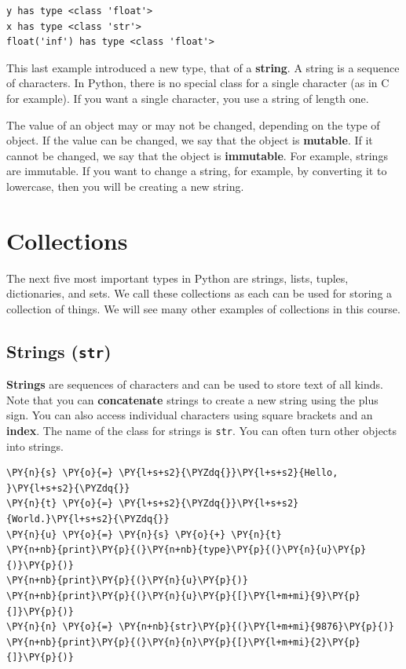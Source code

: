 \begin{Verbatim}
y has type <class 'float'>
x has type <class 'str'>
float('inf') has type <class 'float'>
\end{Verbatim}


This last example introduced a new type, that of a \textbf{string}.  A string is a sequence of characters.  In Python, there is no special class for a single character (as in C for example).
If you want a single character, you use a string of length one.


The value of an object may or may not be changed, depending on the type of object.
If the value can be changed, we say that the object is \textbf{mutable}.
If it cannot be changed, we say that the object is \textbf{immutable}.
For example, strings are immutable.  If you want to change a string, for example, by converting it to lowercase, then you will be creating a new string.

\section{Collections}


The next five most important types in Python are strings, lists, tuples, dictionaries, and sets.  We call these collections as each can be used for storing a collection of things.  We will see many other examples of collections in this course.

\subsection{Strings  (\texttt{str})}


\textbf{Strings} are sequences of characters and can be used to store text of all kinds.  Note that you can \textbf{concatenate} strings to create a new string using the plus sign.  You can also access individual characters using square brackets and an \textbf{index}.  The name of the class for strings is \texttt{str}.  You can often turn other objects into strings.


\begin{Verbatim}[commandchars=\\\{\}]
\PY{n}{s} \PY{o}{=} \PY{l+s+s2}{\PYZdq{}}\PY{l+s+s2}{Hello, }\PY{l+s+s2}{\PYZdq{}}
\PY{n}{t} \PY{o}{=} \PY{l+s+s2}{\PYZdq{}}\PY{l+s+s2}{World.}\PY{l+s+s2}{\PYZdq{}}
\PY{n}{u} \PY{o}{=} \PY{n}{s} \PY{o}{+} \PY{n}{t}
\PY{n+nb}{print}\PY{p}{(}\PY{n+nb}{type}\PY{p}{(}\PY{n}{u}\PY{p}{)}\PY{p}{)}
\PY{n+nb}{print}\PY{p}{(}\PY{n}{u}\PY{p}{)}
\PY{n+nb}{print}\PY{p}{(}\PY{n}{u}\PY{p}{[}\PY{l+m+mi}{9}\PY{p}{]}\PY{p}{)}
\PY{n}{n} \PY{o}{=} \PY{n+nb}{str}\PY{p}{(}\PY{l+m+mi}{9876}\PY{p}{)}
\PY{n+nb}{print}\PY{p}{(}\PY{n}{n}\PY{p}{[}\PY{l+m+mi}{2}\PY{p}{]}\PY{p}{)}
\end{Verbatim}

